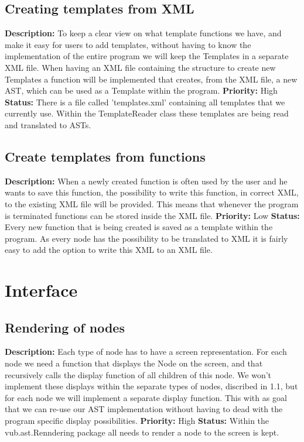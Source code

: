 \documentclass[a4paper,12pt]{report}
\begin{document}
\subsection{Creating templates from XML}
\textbf{Description: } To keep a clear view on what template functions we have, and make it easy for users to add templates, without having to know the implementation
of the entire program we will keep the Templates in a separate XML file. When having an XML file containing the structure to create new Templates a function will be implemented that creates, from the XML file, a new AST, which 
can be used as a Template within the program.\newline
\textbf{Priority:} High \newline
\textbf{Status: }There is a file called 'templates.xml' containing all templates that we currently use. Within the TemplateReader class these templates are being read and translated to ASTs. \newline
\subsection{Create templates from functions}
\textbf{Description: } When a newly created function is often used by the user and he wants to save this function, the possibility to write this function, in correct XML, to
the existing XML file will be provided. This means that whenever the program is terminated functions can be stored inside the XML file.\newline
\textbf{Priority:} Low \newline
\textbf{Status: } Every new function that is being created is saved as a template within the program. As every node has the possibility to be translated to XML it is fairly easy to add the option to write this XML to 
an XML file.\newline
\section{Interface}
\subsection{Rendering of nodes}
\textbf{Description: }Each type of node has to have a screen representation. For each node we need a function that displays the Node on the screen, and 
that recursively calls the display function of all children of this node. We won't implement these displays within the separate types of nodes, discribed in 1.1, but 
for each node we will implement a separate display function. This with as goal that we can re-use our AST implementation without having to dead
with the program specific display possibilities.  \newline
\textbf{Priority:} High \newline
\textbf{Status: } Within the vub.ast.Renndering package all needs to render a node to the screen is kept. \newline
\end{document}
